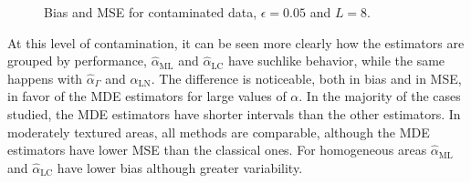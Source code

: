 \documentclass[twocolumn]{svjour3}
\begin{document}
	\begin{figure}[hbt]
		\centering
		\caption{Bias and MSE for contaminated data,  $\epsilon=0.05$ and $ L=8$.}\label{SesgoyECMConContL=8} 
	\end{figure}
	
	
	At this level of contamination, it can be seen more clearly how the estimators are grouped by performance, $\widehat{\alpha}_{\text{{ML}}}$ and $\widehat{\alpha}_{\text{{LC}}}$ have suchlike behavior, while the same happens with $\widehat{\alpha}_{\Gamma}$ and $\widehat{\alpha}_{\text{{LN}}}$.  
	The difference is noticeable, both in bias and in MSE, in favor of the MDE estimators for large values of $\alpha$. 
	In the majority of the cases studied, the MDE estimators have shorter intervals than the other estimators. 
	In moderately textured areas, all methods are comparable, although the MDE estimators have lower MSE than the classical ones. 
	For homogeneous areas $\widehat{\alpha}_{\text{{ML}}}$ and $\widehat{\alpha}_{\text{{LC}}}$ have lower bias although greater variability.
	
\end{document}
